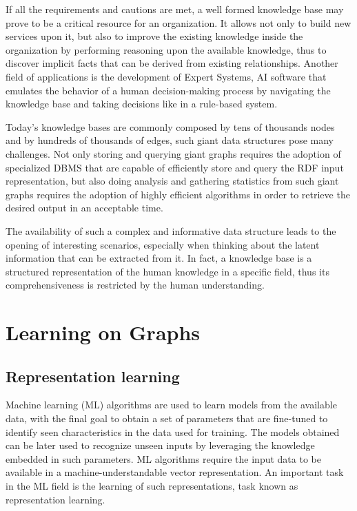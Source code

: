 \documentclass[%
    corpo=13.5pt,
    twoside,
    oldstyle,
    tipotesi=magistrale,
    greek,
    evenboxes
]{toptesi}
\begin{document}
If all the requirements and cautions are met, a well formed knowledge base may
prove to be a critical resource for an organization. It allows not only to
build new services upon it, but also to improve the existing knowledge inside
the organization by performing reasoning upon the available knowledge, thus
to discover implicit facts that can be derived from existing relationships.
Another field of applications is the development of Expert Systems, AI
software that emulates the behavior of a human decision-making process by
navigating the knowledge base and taking decisions like in a rule-based system.

Today's knowledge bases are commonly composed by tens of
thousands nodes and by hundreds of thousands of edges, such giant data
structures pose many challenges.
Not only storing and querying giant graphs requires the adoption of
specialized DBMS that are capable of efficiently store and query the RDF
input representation, but also doing analysis and gathering statistics from
such giant graphs requires the adoption of highly efficient algorithms in
order to retrieve the desired output in an acceptable time.

The availability of such a complex and informative data structure leads
to the opening of interesting scenarios, especially when thinking about
the latent information that can be extracted from it. In
fact, a knowledge base is a structured representation of the
human knowledge in a specific field, thus its comprehensiveness is restricted
by the human understanding.


\section{Learning on Graphs}

\subsection{Representation learning}

Machine learning (ML) algorithms are used to learn models from the
available data, with the final goal to obtain a set of parameters
that are fine-tuned to identify seen characteristics in the data
used for training. The models obtained can be later used to
recognize unseen inputs by leveraging the knowledge embedded
in such parameters.
ML algorithms require the input data to be available in a
machine-understandable vector representation. An important task
in the ML field is the learning of such representations, task known
as representation learning.
\end{document}
